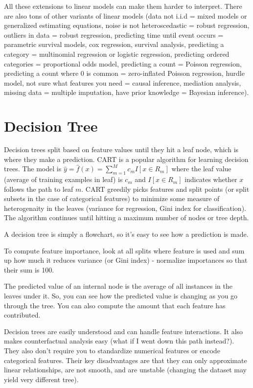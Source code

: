\documentclass[a4paper]{article}
\begin{document}
All these extensions to linear models can make them harder to interpret. There
are also tons of other variants of linear models (data not i.i.d = mixed models
or generalized estimating equations, noise is not heteroscedastic = robust
regression, outliers in data = robust regression, predicting time until
event occurs = parametric survival models, cox regression, survival analysis,
predicting a category = multinomial regression or logistic regression,
predicting ordered categories = proportional odds model, predicting a count
= Poisson regression, predicting a count where 0 is common = zero-inflated Poisson
regression, hurdle model, not sure what features you need = causal inference,
mediation analysis, missing data = multiple imputation, have prior knowledge
= Bayesian inference).

\section{Decision Tree}
Decision trees split based on feature values until they hit a leaf node, which
is where they make a prediction. CART is a popular algorithm for learning
decision trees. The model is $\hat{y} = \hat{f}(x) = \sum_{m=1}^{M}{c_m
I[x \in R_m]}$ where the leaf value (average of training examples in leaf) is
$c_m$ and $I[x \in R_m]$ indicates whether $x$ follows the path to leaf $m$.
CART greedily picks features and split points (or split
subsets in the case of categorical features) to minimize some measure of
heterogenaity in the leaves (variance for regression, Gini index for
classification). The algorithm continues until hitting a maximum number of nodes
or tree depth.

A decision tree is simply a flowchart, so it's easy to see how a prediction
is made.

To compute feature importance, look at all splits where feature is used
and sum up how much it reduces variance (or Gini index) - normalize importances
so that their sum is 100.

The predicted value of an internal node is the average of all instances in the
leaves under it. So, you can see how the predicted value is changing as you
go through the tree. You can also compute the amount that each feature
has contributed.

Decision trees are easily understood and can handle feature interactions. It
also makes counterfactual analysis easy (what if I went down this path
instead?). They also don't require you to standardize numerical features or
encode categorical features. Their key disadvantages are that they can only
approximate linear relationships, are not smooth, and are unstable (changing
the dataset may yield very different tree).
\end{document}
